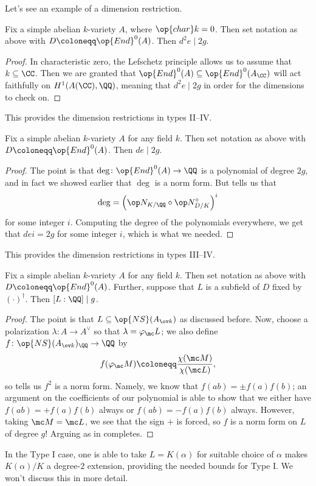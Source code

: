 \documentclass[../notes.tex]{subfiles}
\begin{document}
Let's see an example of a dimension restriction.
\begin{lemma}
	Fix a simple abelian $k$-variety $A$, where $\op{char}k=0$. Then set notation as above with $D\coloneqq\op{End}^0(A)$. Then $d^2e\mid2g$.
\end{lemma}
\begin{proof}
	In characteristic zero, the Lefschetz principle allows us to assume that $k\subseteq\CC$. Then we are granted that $\op{End}^0(A)\subseteq\op{End}^0(A_\CC)$ will act faithfully on $H^1(A(\CC),\QQ)$, meaning that $d^2e\mid 2g$ in order for the dimensions to check on.
\end{proof}
This provides the dimension restrictions in types II--IV.
\begin{lemma} \label{lem:general-degree-albert-bound}
	Fix a simple abelian $k$-variety $A$ for any field $k$. Then set notation as above with $D\coloneqq\op{End}^0(A)$. Then $de\mid2g$.
\end{lemma}
\begin{proof}
	The point is that $\deg\colon\op{End}^0(A)\to\QQ$ is a polynomial of degree $2g$, and in fact we showed earlier that $\deg$ is a norm form. But  tells us that
	\[\deg=\left({\op N_{K/\QQ}}\circ{\op N^\circ_{D/K}}\right)^i\]
	for some integer $i$. Computing the degree of the polynomials everywhere, we get that $dei=2g$ for some integer $i$, which is what we needed.
\end{proof}
This provides the dimension restrictions in types III--IV.
\begin{proposition}
	Fix a simple abelian $k$-variety $A$ for any field $k$. Then set notation as above with $D\coloneqq\op{End}^0(A)$. Further, suppose that $L$ is a subfield of $D$ fixed by $(\cdot)^\dagger$. Then $[L:\QQ]\mid g$.
\end{proposition}
\begin{proof}
	The point is that $L\subseteq\op{NS}(A_{\ov k})$ as discussed before. Now, choose a polarization $\lambda\colon A\to A^\lor$ so that $\lambda=\varphi_\mc L$; we also define $f\colon\op{NS}(A_{\ov k})_\QQ\to\QQ$ by
	\[f(\varphi_\mc M)\coloneqq\frac{\chi(\mc M)}{\chi(\mc L)},\]
	so  tells us $f^2$ is a norm form. Namely, we know that $f(ab)=\pm f(a)f(b)$; an argument on the coefficients of our polynomial is able to show that we either have $f(ab)=+f(a)f(b)$ always or $f(ab)=-f(a)f(b)$ always. However, taking $\mc M=\mc L$, we see that the sign $+$ is forced, so $f$ is a norm form on $L$ of degree $g$! Arguing as in  completes.
\end{proof}
In the Type I case, one is able to take $L=K(\alpha)$ for suitable choice of $\alpha$ makes $K(\alpha)/K$ a degree-$2$ extension, providing the needed bounds for Type I. We won't discuss this in more detail.
\end{document}
